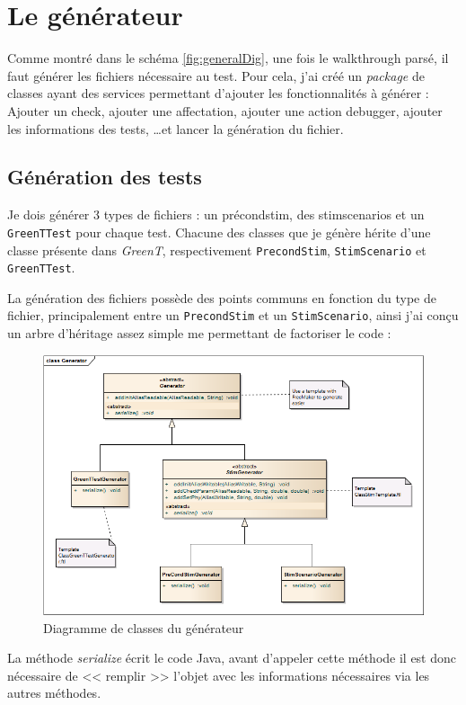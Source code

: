 	\section{Le générateur}
	Comme montré dans le schéma \ref{fig:generalDig}, une fois le walkthrough parsé, il faut générer les fichiers nécessaire au test. Pour cela, j'ai créé un \textit{package} de classes ayant des services permettant d'ajouter les fonctionnalités à générer : Ajouter un check, ajouter une affectation, ajouter une action debugger, ajouter les informations des tests, \ldots et lancer la génération du fichier.

		\subsection{Génération des tests}
		Je dois générer 3 types de fichiers : un précondstim, des stimscenarios et un \texttt{GreenTTest} pour chaque test. Chacune des classes que je génère hérite d'une classe présente dans \textit{GreenT}, respectivement \texttt{PrecondStim}, \texttt{StimScenario} et \texttt{GreenTTest}.

		La génération des fichiers possède des points communs en fonction du type de fichier, principalement entre un \texttt{PrecondStim} et un \texttt{StimScenario}, ainsi j'ai conçu un arbre d'héritage assez simple me permettant de factoriser le code : 
		\begin{figure}[H]
		\centering
		\includegraphics[width=14cm]{contents/images/generatorClass.png}
		\caption{Diagramme de classes du générateur}
		\end{figure}
		La méthode \textit{serialize} écrit le code Java, avant d'appeler cette méthode il est donc nécessaire de << remplir >> l'objet avec les informations nécessaires via les autres méthodes.
		
